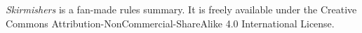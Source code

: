 \emph{Skirmishers} is a fan-made rules summary.
It is freely available under the Creative Commons Attribution-NonCommercial-ShareAlike 4.0 International License.
